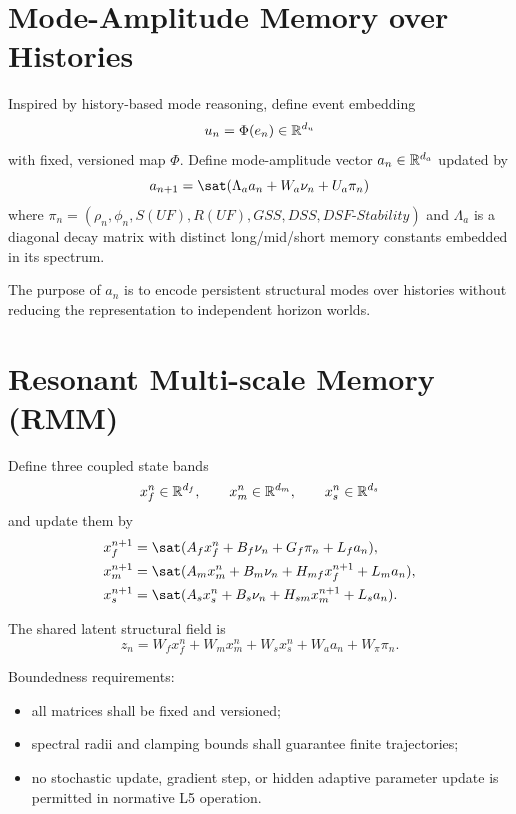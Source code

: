\section{Mode-Amplitude Memory over Histories}

Inspired by history-based mode reasoning, define event embedding
\[
u_n = \Phi(e_n) \in \mathbb{R}^{d_u}
\]
with fixed, versioned map $\Phi$. Define mode-amplitude vector $a_n\in\mathbb{R}^{d_a}$ updated by
\[
a_{n+1} = \sat(\Lambda_a a_n + W_a \nu_n + U_a \pi_n)
\]
where $\pi_n=(\rho_n,\phi_n,S(UF),R(UF),GSS,DSS,DSF\text{-}Stability)$ and $\Lambda_a$ is a diagonal decay matrix with distinct long/mid/short memory constants embedded in its spectrum.

The purpose of $a_n$ is to encode persistent structural modes over histories without reducing the representation to independent horizon worlds.

\section{Resonant Multi-scale Memory (RMM)}

Define three coupled state bands
\[
x_f^n\in\mathbb{R}^{d_f},\qquad x_m^n\in\mathbb{R}^{d_m},\qquad x_s^n\in\mathbb{R}^{d_s}
\]
and update them by
\begin{align*}
x_f^{n+1} &= \sat(A_f x_f^n + B_f\nu_n + G_f\pi_n + L_f a_n),\\
x_m^{n+1} &= \sat(A_m x_m^n + B_m\nu_n + H_{mf}x_f^{n+1} + L_m a_n),\\
x_s^{n+1} &= \sat(A_s x_s^n + B_s\nu_n + H_{sm}x_m^{n+1} + L_s a_n).
\end{align*}

The shared latent structural field is
\[
z_n = W_f x_f^n + W_m x_m^n + W_s x_s^n + W_a a_n + W_\pi \pi_n.
\]

Boundedness requirements:
\begin{itemize}
    \item all matrices shall be fixed and versioned;
    \item spectral radii and clamping bounds shall guarantee finite trajectories;
    \item no stochastic update, gradient step, or hidden adaptive parameter update is permitted in normative L5 operation.
\end{itemize}

